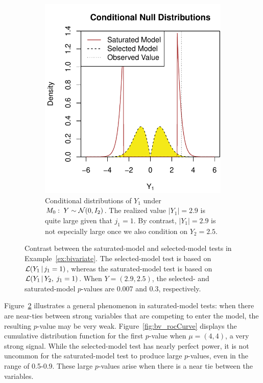 \documentclass{article}
\begin{document}
\begin{figure}
\begin{subfigure}[t]{.4\textwidth}
    \includegraphics[width=\textwidth]{figs/bivariateSelVSat_nullDists.pdf}
    \caption{Conditional distributions of $Y_1$ under
      $M_0:\; Y \sim \mathcal{N}(0,I_2)$. The realized value $|Y_1|=2.9$ is
      quite large given that $j_1=1$. By
      contrast, $|Y_1|=2.9$ is not especially large once we 
      also condition on $Y_2=2.5$.}
  \label{fig:bv_nullDists}
  \end{subfigure}
  \caption{Contrast between the saturated-model and selected-model
    tests in Example~\ref{ex:bivariate}. The selected-model test is based on  $\mathcal{L}(Y_1 \,|\, j_1=1)$,  whereas the saturated-model test is based on $\mathcal{L}(Y_1  \,|\, Y_2, \; j_1=1)$. 
    When $Y=(2.9, 2.5)$, the selected- and saturated-model $p$-values are 0.007 and 0.3, respectively.}
  \label{fig:bv}
\end{figure}

Figure~\ref{fig:bv} illustrates a general phenomenon in saturated-model tests: when there are near-ties between strong variables that are competing to enter the model, the resulting $p$-value may be very weak. Figure~\ref{fig:bv_rocCurve} displays the cumulative distribution function for the first $p$-value when $\mu=(4,4)$, a very strong signal. While the selected-model test has nearly perfect power, it is not uncommon for the saturated-model test to produce large $p$-values, even in the range of 0.5-0.9. These large $p$-values arise when there is a near tie between the variables.
\end{document}
